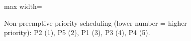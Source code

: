 \begin{figure}[!htbp]
\centering
\begin{adjustbox}{max width=\linewidth}
\end{adjustbox}
\caption{Non-preemptive priority scheduling (lower number = higher priority): P2 (1), P5 (2), P1 (3), P3
(4), P4 (5).}
\end{figure}
